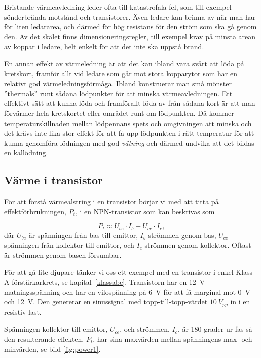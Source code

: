 Bristande värmeavledning leder ofta till katastrofala fel, som till exempel
sönderbrända motstånd och transistorer. Även ledare kan brinna av när man
har för liten ledararea, och därmed för hög resistans för den ström som
ska gå genom den. Av det skälet finns dimensioneringsregler, till exempel
krav på minsta arean av koppar i ledare, helt enkelt för att det inte ska
uppstå brand.

En annan effekt av värmeledning är att det kan ibland vara svårt att löda
på kretskort, framför allt vid ledare som går mot stora kopparytor som
har en relativt god värmeledningsförmåga. Ibland konstruerar man små mönster
''thermals'' runt sådana lödpunkter för att minska värmeavledningen.
Ett effektivt sätt att kunna löda och framförallt löda av från sådana
kort är att man förvärmer hela kretskortet eller området runt om
lödpunkten. Då kommer temperaturskillnaden mellan lödpennans spets och
omgivningen att minska och det krävs inte lika stor effekt för att få
upp lödpunkten i rätt temperatur för att kunna genomföra lödningen med god
\emph{vätning} och därmed undvika att det bildas en kallödning.

\subsection{Värme i transistor}


För att förstå värmealstring i en transistor börjar vi med att titta
på effektförbrukningen, \(P_t\), i en NPN-transistor som kan beskrivas
som

\[P_t \approx U_{be}\cdot I_b + U_{ce}\cdot I_c,\]
%
där \(U_{be}\) är spänningen från bas till emittor, \(I_b\)
strömmen genom bas,  \(U_{ce}\) spänningen från kollektor till
emittor, och \(I_c\) strömmen genom kollektor.
Oftast är strömmen genom basen försumbar.

För att gå lite djupare tänker vi oss ett exempel med en transistor i
enkel Klass A förstärkarkrets, se kapital~\ref{klassabc}.
Transistorn har en \SI{12}{\volt} matningsspänning och har en
vilospänning på \SI{6}{\volt} för att få marginal mot \SI{0}{\volt}
och \SI{+12}{\volt}.
Den genererar en sinussignal med topp-till-topp-värdet \(10\ V_{pp}\)
in i en resistiv last.

Spänningen kollektor till emittor, \(U_{ce}\), och strömmen, \(I_c\),
är 180 grader ur fas så den resulterande effekten, \(P_t\), har sina
maxvärden mellan spänningens max- och minvärden, se bild
\ref{fig:power1}.

